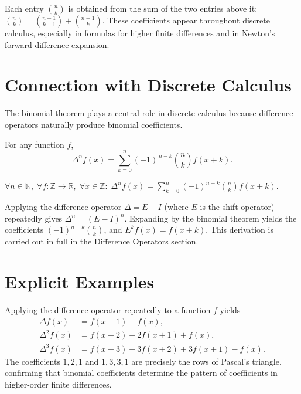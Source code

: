 \begin{remark*}
Each entry \(\binom{n}{k}\) is obtained from the sum of the two entries
above it: \(\binom{n}{k}=\binom{n-1}{k-1}+\binom{n-1}{k}\).
These coefficients appear throughout discrete calculus, especially in
formulas for higher finite differences and in Newton's forward difference
expansion.
\end{remark*}

\section*{Connection with Discrete Calculus}

The binomial theorem plays a central role in discrete calculus because
difference operators naturally produce binomial coefficients.

\begin{proposition}
\label{prop:higher-diff-formula}
For any function \(f\),
\[
\Delta^n f(x)
=
\sum_{k=0}^{n} (-1)^{\,n-k}
\binom{n}{k}
f(x+k).
\]
\end{proposition}

\begin{remark*}
\(\forall n \in \mathbb{N},\; \forall f : \mathbb{Z}\to\mathbb{R},\; \forall x \in \mathbb{Z}:\;
\Delta^n f(x) = \displaystyle\sum_{k=0}^{n}(-1)^{n-k}\binom{n}{k}f(x+k)\).
\end{remark*}

\begin{remark*}
Applying the difference operator \(\Delta = E - I\) (where \(E\) is the shift
operator) repeatedly gives \(\Delta^n = (E-I)^n\). Expanding by the binomial
theorem yields the coefficients \((-1)^{n-k}\binom{n}{k}\), and \(E^k f(x) = f(x+k)\).
This derivation is carried out in full in the Difference Operators section.
\end{remark*}

\section*{Explicit Examples}

Applying the difference operator repeatedly to a function \(f\) yields
\[
\begin{aligned}
\Delta f(x) &= f(x+1)-f(x), \\
\Delta^2 f(x) &= f(x+2)-2f(x+1)+f(x), \\
\Delta^3 f(x) &= f(x+3)-3f(x+2)+3f(x+1)-f(x).
\end{aligned}
\]
The coefficients \(1, 2, 1\) and \(1, 3, 3, 1\) are precisely the rows of
Pascal's triangle, confirming that binomial coefficients determine the pattern
of coefficients in higher-order finite differences.
